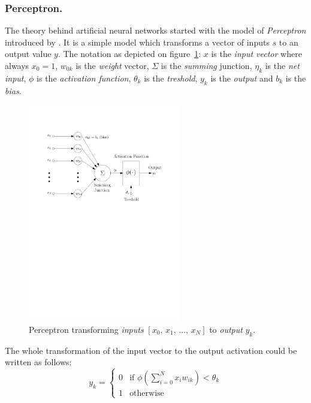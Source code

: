 \subsubsection{Perceptron.}
\label{sec:models-perceptron}

The theory behind artificial neural networks started with the model of \emph{Perceptron} introduced by \citet{mcculloch1943logical}. It is a simple model which transforms a vector of inputs $s$ to an output value $y$. The notation as depicted on figure~\ref{fig:perceptron}: $x$ is the \emph{input vector} where always $x_0=1$, $w_{0k}$ is the \emph{weight} vector, $\Sigma$ is the \emph{summing} junction, $\eta_k$ is the \emph{net input}, $\phi$ is the \emph{activation function}, $\theta_k$ is the \emph{treshold}, $y_k$ is the \emph{output} and $b_k$ is the \emph{bias}.

\begin{figure}[H]
  \centering
  \includegraphics[width=0.6\textwidth]{img/perceptron.pdf}    
  \caption{Perceptron transforming \emph{inputs} $[x_0,\, x_1,\, \ldots,\, x_N]$ to \emph{output} $y_k$.} 
  \label{fig:perceptron}
\end{figure}

The whole transformation of the input vector to the output activation could be written as follows: 
\begin{equation}
\label{eq:perceptron} 
y_k =
\left\{
	\begin{array}{ll}
		0 & \mbox{if } \phi(\sum_{i=0}^N x_iw_{ik}) < \theta_k \\
		1 & \mbox{otherwise}
	\end{array}
\right.
\end{equation} 

